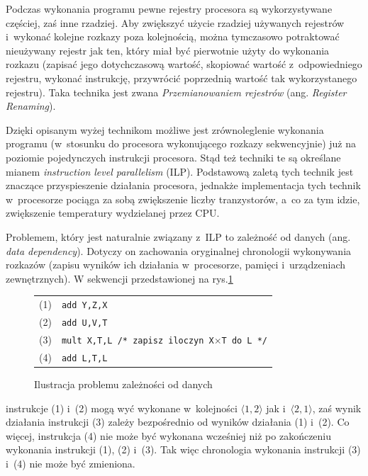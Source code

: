 \documentclass[11pt,makeidx]{mwart}
\begin{document}
\par
%
\indent
	Podczas wykonania programu pewne rejestry procesora są wykorzystywane częściej, zaś inne rzadziej. Aby zwiększyć użycie rzadziej
	używanych rejestrów i~wykonać kolejne rozkazy poza kolejnością, można tymczasowo potraktować nieużywany rejestr jak ten, który miał
	być pierwotnie użyty do wykonania rozkazu (zapisać jego dotychczasową wartość, skopiować wartość z~odpowiedniego rejestru, wykonać instrukcję,
	przywrócić poprzednią wartość tak wykorzystanego rejestru). Taka technika jest zwana 
	\emph{Przemianowaniem rejestrów} (ang. \emph{Register Renaming}).
\par
%
\indent
	Dzięki opisanym wyżej technikom możliwe jest zrównoleglenie wykonania programu (w~stosunku do procesora wykonującego rozkazy sekwencyjnie)
	już na poziomie pojedynczych instrukcji procesora. Stąd też techniki te są określane mianem \emph{instruction level parallelism} (ILP).
	Podstawową zaletą tych technik jest znaczące przyspieszenie działania procesora, jednakże implementacja tych technik w~procesorze pociąga za
	sobą zwiększenie liczby tranzystorów, a~co za tym idzie, zwiększenie temperatury wydzielanej przez CPU.
\par
%
\indent
	Problemem, który jest naturalnie związany z~ILP to zależność od danych (ang. \emph{data dependency}).
	Dotyczy on zachowania oryginalnej chronologii wykonywania rozkazów (zapisu wyników
	ich działania w~procesorze, pamięci i~urządzeniach zewnętrznych). W sekwencji przedstawionej na rys.\ref{fig:datadep}
	\begin{figure}[h]
	\begin{tabular}{l l}\\
		(1) & {\tt add Y,Z,X} \\
		(2) & {\tt add U,V,T} \\
		(3) & {\tt mult X,T,L /* zapisz iloczyn X}$\times${\tt T do L */} \\
		(4) & {\tt add L,T,L} \\
	\end{tabular}
	\caption{Ilustracja problemu zależności od danych}
	\label{fig:datadep}
	\end{figure}
	instrukcje (1) i~(2) mogą wyć wykonane w~kolejności $\langle 1,2 \rangle$ jak i~$\langle 2,1 \rangle$, zaś wynik działania instrukcji
	(3) zależy bezpośrednio od wyników działania (1) i~(2). Co więcej, instrukcja (4) nie może być wykonana wcześniej 
	niż po zakończeniu wykonania instrukcji (1), (2) i~(3). Tak więc chronologia wykonania instrukcji (3) i~(4) nie może być zmieniona.
\par
\end{document}
